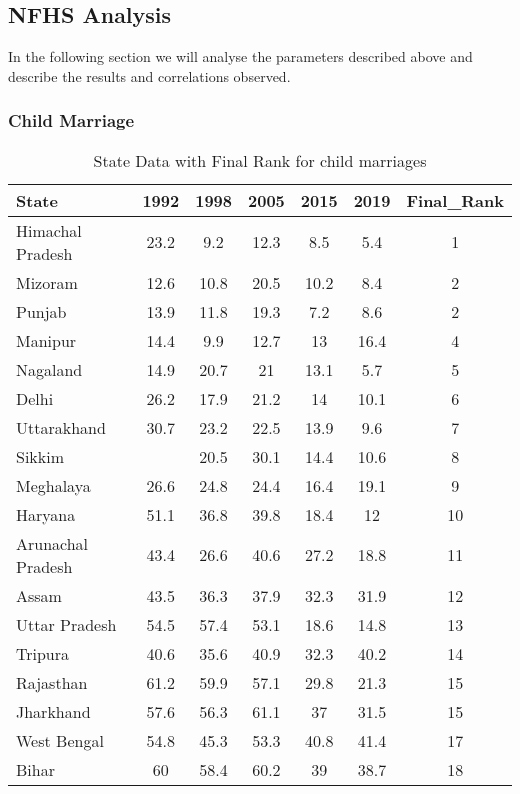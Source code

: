 \subsection{NFHS Analysis}
In the following section we will analyse the parameters described above and describe the results and correlations observed.
\subsubsection{Child Marriage}
\begin{table}[h!]
\centering
\begin{tabular}{lcccccc}
\toprule
State             & 1992 & 1998 & 2005 & 2015 & 2019 & Final\_Rank \\
\midrule
Himachal Pradesh  & 23.2 & 9.2  & 12.3 & 8.5  & 5.4  & 1          \\
Mizoram           & 12.6 & 10.8 & 20.5 & 10.2 & 8.4  & 2          \\
Punjab            & 13.9 & 11.8 & 19.3 & 7.2  & 8.6  & 2          \\
Manipur           & 14.4 & 9.9  & 12.7 & 13   & 16.4 & 4          \\
Nagaland          & 14.9 & 20.7 & 21   & 13.1 & 5.7  & 5          \\
Delhi             & 26.2 & 17.9 & 21.2 & 14   & 10.1 & 6          \\
Uttarakhand       & 30.7 & 23.2 & 22.5 & 13.9 & 9.6  & 7          \\
Sikkim            &      & 20.5 & 30.1 & 14.4 & 10.6 & 8          \\
Meghalaya         & 26.6 & 24.8 & 24.4 & 16.4 & 19.1 & 9          \\
Haryana           & 51.1 & 36.8 & 39.8 & 18.4 & 12   & 10         \\
Arunachal Pradesh & 43.4 & 26.6 & 40.6 & 27.2 & 18.8 & 11         \\
Assam             & 43.5 & 36.3 & 37.9 & 32.3 & 31.9 & 12         \\
Uttar Pradesh     & 54.5 & 57.4 & 53.1 & 18.6 & 14.8 & 13         \\
Tripura           & 40.6 & 35.6 & 40.9 & 32.3 & 40.2 & 14         \\
Rajasthan         & 61.2 & 59.9 & 57.1 & 29.8 & 21.3 & 15         \\
Jharkhand         & 57.6 & 56.3 & 61.1 & 37   & 31.5 & 15         \\
West Bengal       & 54.8 & 45.3 & 53.3 & 40.8 & 41.4 & 17         \\
Bihar             & 60   & 58.4 & 60.2 & 39   & 38.7 & 18         \\
\bottomrule
\end{tabular}
\caption{State Data with Final Rank for child marriages}
\label{tab:child_marriage}
\end{table}


